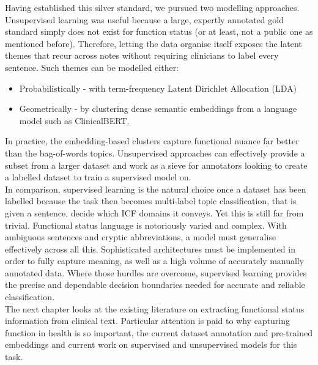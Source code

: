 Having established this silver standard, we pursued two modelling approaches. Unsupervised learning was useful because a large, expertly annotated gold standard simply does not exist for function status (or at least, not a public one as mentioned before). Therefore, letting the data organise itself exposes the latent themes that recur across notes without requiring clinicians to label every sentence. Such themes can be modelled either:

\begin{itemize}
    \item Probabilistically - with term-frequency Latent Dirichlet Allocation (LDA)
    \item Geometrically - by clustering dense semantic embeddings from a language model such as ClinicalBERT.
\end{itemize}

In practice, the embedding-based clusters capture functional nuance far better than the bag-of-words topics. Unsupervised approaches can effectively provide a subset from a larger dataset and work as a sieve for annotators looking to create a labelled dataset to train a supervised model on. \\

In comparison, supervised learning is the natural choice once a dataset has been labelled because the task then becomes multi-label topic classification, that is given a sentence, decide which ICF domains it conveys. Yet this is still far from trivial. Functional status language is notoriously varied and complex. With ambiguous sentences and cryptic abbreviations, a model must generalise effectively across all this. Sophisticated architectures must be implemented in order to fully capture meaning, as well as a high volume of accurately manually annotated data. Where those hurdles are overcome, supervised learning provides the precise and dependable decision boundaries needed for accurate and reliable classification. \\

The next chapter looks at the existing literature on extracting functional status information from clinical text. Particular attention is paid to why capturing function in health is so important, the current dataset annotation and pre-trained embeddings and current work on supervised and unsupervised models for this task.